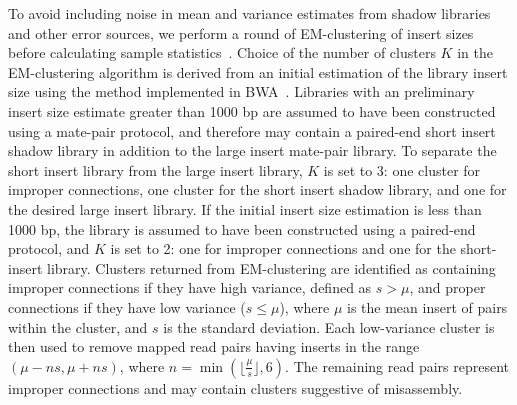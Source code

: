 \documentclass{bioinfo}
\begin{document}
To avoid including noise in mean and variance estimates from shadow libraries and other error sources, 
we perform a round of EM-clustering of insert sizes before calculating sample statistics~\citep{GuptaChen2010}. Choice of 
the number of clusters $K$ in
the EM-clustering algorithm is derived from an initial estimation of the library insert size using the method implemented in
BWA~\citep{bwa}. Libraries with an preliminary
insert size estimate greater than 1000 bp are assumed to have been constructed using a mate-pair protocol, and therefore
may contain a paired-end short insert shadow library in addition to the large insert mate-pair library. To separate the short insert library
from the large insert library, $K$ is set to 3: one cluster for improper connections, one cluster for the short insert
shadow library, and one for the desired large insert library. If the initial insert size estimation is less than 1000 bp, the library
is assumed to have been constructed using a paired-end protocol, and $K$ is set to 2: one for improper connections
and one for the short-insert library. Clusters returned from EM-clustering are identified as containing improper connections if 
they have high variance, defined as $s > \mu$, and proper connections if they have low variance ($s \le \mu$), where $\mu$ is the mean insert of pairs within
the cluster, and $s$ is the standard deviation. Each low-variance cluster is then used to remove mapped read pairs 
 having inserts in the range $(\mu-ns,\mu+ns)$, where $n = \min(\lfloor\frac{\mu}{s}\rfloor, 6)$.  The remaining read
pairs represent improper connections and may contain clusters suggestive of misassembly.
\end{document}
